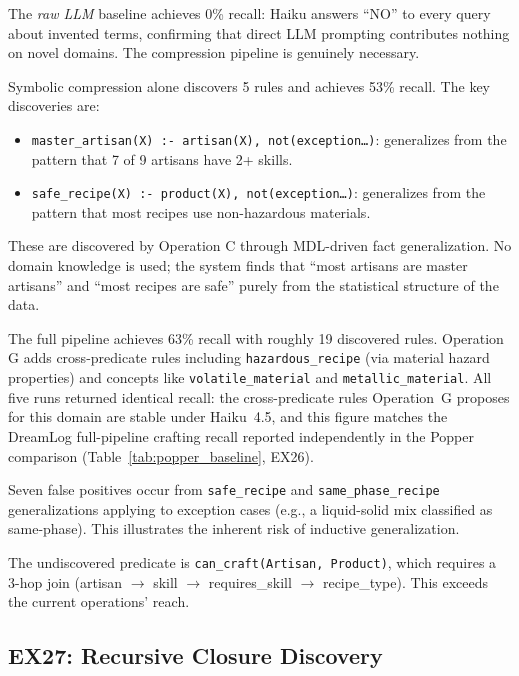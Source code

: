 \documentclass[10pt,conference]{IEEEtran}
\begin{document}
The \textit{raw LLM} baseline achieves 0\% recall: Haiku answers ``NO'' to every query about invented terms, confirming that direct LLM prompting contributes nothing on novel domains. The compression pipeline is genuinely necessary.

Symbolic compression alone discovers 5 rules and achieves 53\% recall. The key discoveries are:
\begin{itemize}
\item \texttt{master\_artisan(X) :- artisan(X), not(exception\ldots)}: generalizes from the pattern that 7 of 9 artisans have 2+ skills.
\item \texttt{safe\_recipe(X) :- product(X), not(exception\ldots)}: generalizes from the pattern that most recipes use non-hazardous materials.
\end{itemize}

These are discovered by Operation C through MDL-driven fact generalization. No domain knowledge is used; the system finds that ``most artisans are master artisans'' and ``most recipes are safe'' purely from the statistical structure of the data.

The full pipeline achieves 63\% recall with roughly 19 discovered rules. Operation G adds cross-predicate rules including \texttt{hazardous\_recipe} (via material hazard properties) and concepts like \texttt{volatile\_material} and \texttt{metallic\_material}. All five runs returned identical recall: the cross-predicate rules Operation~G proposes for this domain are stable under Haiku~4.5, and this figure matches the DreamLog full-pipeline crafting recall reported independently in the Popper comparison (Table~\ref{tab:popper_baseline}, EX26).

Seven false positives occur from \texttt{safe\_recipe} and \texttt{same\_phase\_recipe} generalizations applying to exception cases (e.g., a liquid-solid mix classified as same-phase). This illustrates the inherent risk of inductive generalization.

The undiscovered predicate is \texttt{can\_craft(Artisan, Product)}, which requires a 3-hop join (artisan $\to$ skill $\to$ requires\_skill $\to$ recipe\_type). This exceeds the current operations' reach.

\subsection{EX27: Recursive Closure Discovery}
\label{sec:ex27}
\end{document}
